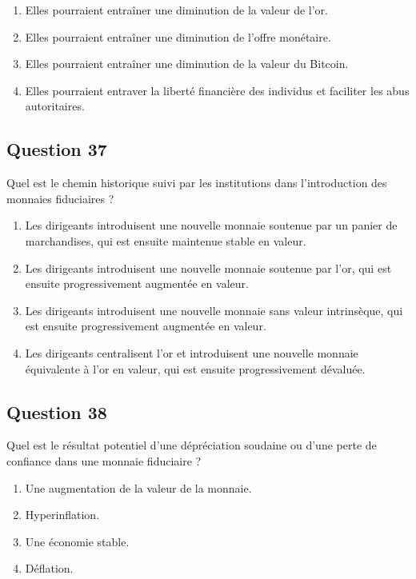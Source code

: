 \documentclass[12pt,a4paper]{article}
\begin{document}
\begin{enumerate}[label=\Alph*., leftmargin=*]
\item Elles pourraient entraîner une diminution de la valeur de l'or.
\item Elles pourraient entraîner une diminution de l'offre monétaire.
\item Elles pourraient entraîner une diminution de la valeur du Bitcoin.
\item Elles pourraient entraver la liberté financière des individus et faciliter les abus autoritaires.
\end{enumerate}

\bigskip


\subsection*{Question 37}
Quel est le chemin historique suivi par les institutions dans l'introduction des monnaies fiduciaires ?

\begin{enumerate}[label=\Alph*., leftmargin=*]
\item Les dirigeants introduisent une nouvelle monnaie soutenue par un panier de marchandises, qui est ensuite maintenue stable en valeur.
\item Les dirigeants introduisent une nouvelle monnaie soutenue par l'or, qui est ensuite progressivement augmentée en valeur.
\item Les dirigeants introduisent une nouvelle monnaie sans valeur intrinsèque, qui est ensuite progressivement augmentée en valeur.
\item Les dirigeants centralisent l'or et introduisent une nouvelle monnaie équivalente à l'or en valeur, qui est ensuite progressivement dévaluée.
\end{enumerate}

\bigskip


\subsection*{Question 38}
Quel est le résultat potentiel d'une dépréciation soudaine ou d'une perte de confiance dans une monnaie fiduciaire ?

\begin{enumerate}[label=\Alph*., leftmargin=*]
\item Une augmentation de la valeur de la monnaie.
\item Hyperinflation.
\item Une économie stable.
\item Déflation.
\end{enumerate}
\end{document}
